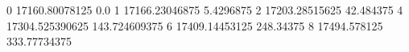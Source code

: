 0 17160.80078125 0.0
1 17166.23046875 5.4296875
2 17203.28515625 42.484375
4 17304.525390625 143.724609375
6 17409.14453125 248.34375
8 17494.578125 333.77734375
